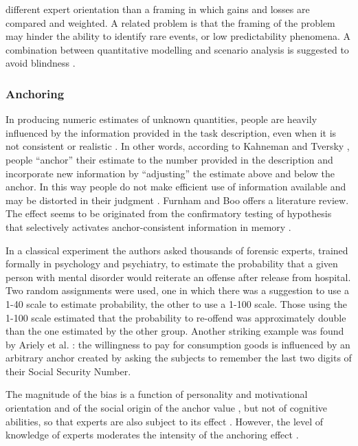 \documentclass[]{book}
\begin{document}
different expert orientation than a framing in which gains and losses
are compared and weighted. A related problem is that the framing of the
problem may hinder the ability to identify rare events, or low
predictability phenomena. A combination between quantitative modelling
and scenario analysis is suggested to avoid blindness
\citep{makridakis2009forecasting}.

\subsubsection*{Anchoring}\label{anchoring}

In producing numeric estimates of unknown quantities, people are heavily
influenced by the information provided in the task description, even
when it is not consistent or realistic \citep{gigerenzer2015calculated}.
In other words, according to Kahneman and Tversky
\citep{tversky1974judgment}, people ``anchor'' their estimate to the
number provided in the description and incorporate new information by
``adjusting'' the estimate above and below the anchor. In this way
people do not make efficient use of information available and may be
distorted in their judgment \citep{thorsteinson2008anchoring}. Furnham
and Boo \citep{furnham2011literature} offers a literature review. The
effect seems to be originated from the confirmatory testing of
hypothesis that selectively activates anchor-consistent information in
memory \citep{block1991overconfidence, chapman1999anchoring}.

In a classical experiment \citep{slovic2000violence} the authors asked
thousands of forensic experts, trained formally in psychology and
psychiatry, to estimate the probability that a given person with mental
disorder would reiterate an offense after release from hospital. Two
random assignments were used, one in which there was a suggestion to use
a 1-40 scale to estimate probability, the other to use a 1-100 scale.
Those using the 1-100 scale estimated that the probability to re-offend
was approximately double than the one estimated by the other group.
Another striking example was found by Ariely et al.
\citep{ariely2003coherent}: the willingness to pay for consumption goods
is influenced by an arbitrary anchor created by asking the subjects to
remember the last two digits of their Social Security Number.

The magnitude of the bias is a function of personality and motivational
orientation \citep{eroglu2010biases} and of the social origin of the
anchor value \citep{meub2015anchoring}, but not of cognitive abilities,
so that experts are also subject to its effect
\citep{mussweiler2000numeric, oechssler2009cognitive, bergman2010anchoring}.
However, the level of knowledge of experts moderates the intensity of
the anchoring effect \citep{wilson1996new, smith2013knowledge}.
\end{document}

